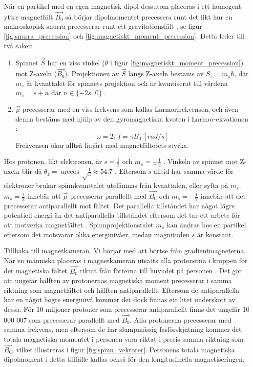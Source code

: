 \documentclass[11pt, a4paper]{article}
\begin{document}
När en partikel med en egen magnetisk dipol dessutom placeras i ett homogent yttre magnetfält $\vec{B_0}$ så börjar dipolmomentet precessera runt det likt hur en makroskopisk snurra precesserar runt ett gravitationsfält \parencite{larmor_precession}, se figur \ref{fig:snurra_precession} och \ref{fig:magnetiskt_moment_precession}. Detta leder till två saker:
\begin{enumerate}
	\item Spinnet $\vec{S}$ har en viss vinkel ($\theta$ i figur \ref{fig:magnetiskt_moment_precession}) mot Z-axeln ($\vec{B_0}$). Projektionen av $\vec{S}$ längs Z-axeln bestäms av $S_z=m_s\hbar$, där $m_s$ är kvanttalet för spinnets projektion och är kvantiserat till värdena $m_s=s+n$ där $n\in\{-2s..0\}$ \parencite{university_physics}.
	\item $\vec{\mu}$ precesserar med en viss frekvens som kallas Larmorfrekvensen, och även denna bestäms med hjälp av den gyromagnetiska kvoten i Larmor-ekvationen \parencite{mri_lärobok}:
	\begin{equation}\label{eq:larmor}
		\omega=2\pi f=\gamma B_0\:[\si{rad/s}]
	\end{equation}
	Frekvensen ökar alltså linjärt med magnetfältetets styrka.
\end{enumerate}

Hos protonen, likt elektronen, är $s=\frac{1}{2}$ och $m_s=\pm\frac{1}{2}$ \parencite{college_physics}. Vinkeln av spinnet mot Z-axeln blir då $\theta_z=\arccos\sqrt\frac{1}{3}\approx54.7^\circ$. Eftersom $s$ alltid har samma värde för elektroner brukar spinnkvanttalet utelämnas från kvanttalen, eller syfta på $m_s$. $m_s=\frac{1}{2}$ innebär att $\vec{\mu}$ precesserar parallellt med $\vec{B_0}$ och $m_s=-\frac{1}{2}$ innebär att det precesserar antiparallellt mot fältet. Det parallella tillståndet har något lägre potentiell energi än det antiparallella tillståndet eftersom det tar ett arbete för att motverka magnetfältet \parencite{electron_spin}. Spinnprojektionstalet $m_s$ kan ändras hos en partikel eftersom det motsvarar olika energinivåer, medan magnituden $s$ är konstant. 

Tillbaka till magnetkameran. Vi börjar med att bortse från gradientmagneterna. När en människa placeras i magnetkameran utsätts alla protonerna i kroppen för det magnetiska fältet $\vec{B_0}$ riktat från fötterna till huvudet på personen \parencite{understanding_mri}. Det gör att ungefär hälften av protonernas magnetiska moment precesserar i samma riktning som magnetfältet och hälften antiparallellt. Eftersom de antiparallella har en något högre energinivå kommer det dock finnas ett litet underskott av dessa. För 10 miljoner protoner som precesserar antiparallellt finns det ungefär 10 000 007 som precesserar parallellt med $\vec{B_0}$. Alla protonerna precesserar med samma frekvens, men eftersom de har slumpmässig fasförskjutning kommer det totala magnetiska momentet i personen vara riktat i precis samma riktning som $\vec{B_0}$, vilket illustreras i figur \ref{fig:spinn_vektorer}. Personens totala magnetiska dipolmoment i detta tillfälle kallas också för den longitudinella magnetiseringen.
\end{document}

